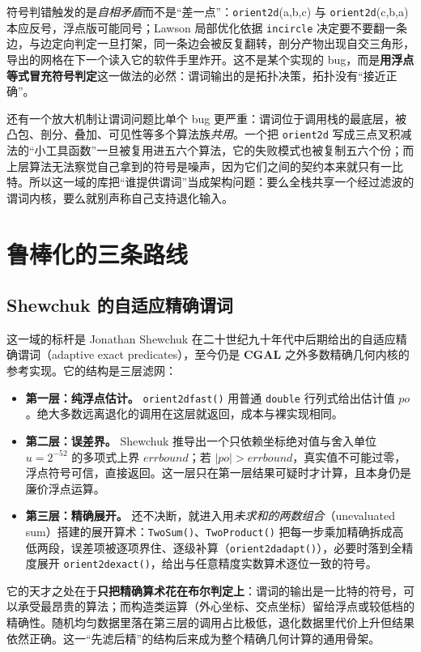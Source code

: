 \documentclass[12pt,a4paper,fontset=fandol]{ctexbook}
\newcommand{\Fn}[1]{\texttt{#1()}}
\newcommand{\Tp}[1]{\texttt{#1}}
\newcommand{\Lib}[1]{\textbf{#1}}
\begin{document}
符号判错触发的是\emph{自相矛盾}而不是``差一点''：\Tp{orient2d}(a,b,c) 与 \Tp{orient2d}(c,b,a) 本应反号，浮点版可能同号；Lawson 局部优化依据 \Tp{incircle} 决定要不要翻一条边，与边定向判定一旦打架，同一条边会被反复翻转，剖分产物出现自交三角形，导出的网格在下一个读入它的软件手里炸开。这不是某个实现的 bug，而是\textbf{用浮点等式冒充符号判定}这一做法的必然：谓词输出的是拓扑决策，拓扑没有``接近正确''。

还有一个放大机制让谓词问题比单个 bug 更严重：谓词位于调用栈的最底层，被凸包、剖分、叠加、可见性等多个算法族\emph{共用}。一个把 \Tp{orient2d} 写成三点叉积减法的``小工具函数''一旦被复用进五六个算法，它的失败模式也被复制五六个份；而上层算法无法察觉自己拿到的符号是噪声，因为它们之间的契约本来就只有一比特。所以这一域的库把``谁提供谓词''当成架构问题：要么全栈共享一个经过滤波的谓词内核，要么就别声称自己支持退化输入。

\section{鲁棒化的三条路线}

\subsection{Shewchuk 的自适应精确谓词}

这一域的标杆是 Jonathan Shewchuk 在二十世纪九十年代中后期给出的自适应精确谓词（adaptive exact predicates），至今仍是 \Lib{CGAL} 之外多数精确几何内核的参考实现。它的结构是三层滤网：

\begin{itemize}
\item \textbf{第一层：纯浮点估计。} \Fn{orient2dfast} 用普通 \Tp{double} 行列式给出估计值 $po$。绝大多数远离退化的调用在这层就返回，成本与裸实现相同。
\item \textbf{第二层：误差界。} Shewchuk 推导出一个只依赖坐标绝对值与舍入单位 $u=2^{-52}$ 的多项式上界 $errbound$；若 $|po|>errbound$，真实值不可能过零，浮点符号可信，直接返回。这一层只在第一层结果可疑时才计算，且本身仍是廉价浮点运算。
\item \textbf{第三层：精确展开。} 还不决断，就进入用\emph{未求和的两数组合}（unevaluated sum）搭建的展开算术：\Fn{TwoSum}、\Fn{TwoProduct} 把每一步乘加精确拆成高低两段，误差项被逐项界住、逐级补算（\Fn{orient2dadapt}），必要时落到全精度展开 \Fn{orient2dexact}，给出与任意精度实数算术逐位一致的符号。
\end{itemize}

它的天才之处在于\textbf{只把精确算术花在布尔判定上}：谓词的输出是一比特的符号，可以承受最昂贵的算法；而构造类运算（外心坐标、交点坐标）留给浮点或较低档的精确性。随机均匀数据里落在第三层的调用占比极低，退化数据里代价上升但结果依然正确。这一``先滤后精''的结构后来成为整个精确几何计算的通用骨架。
\end{document}
